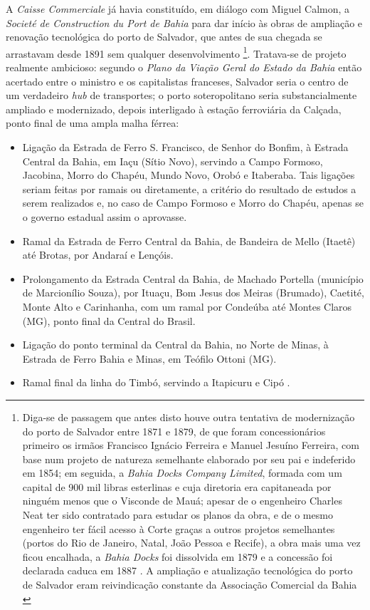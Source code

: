 A \textit{Caisse Commerciale} já havia constituído, em diálogo com Miguel Calmon, a \textit{Societé de Construction du Port de Bahia} para dar início às obras de ampliação e renovação tecnológica do porto de Salvador, que antes de sua chegada se arrastavam desde 1891 sem qualquer desenvolvimento \cite[p.~176-180]{rosado_porto_2016}\footnote{Diga-se de passagem que antes disto houve outra tentativa de modernização do porto de Salvador entre 1871 e 1879, de que foram concessionários primeiro os irmãos Francisco Ignácio Ferreira e Manuel Jesuíno Ferreira, com base num projeto de natureza semelhante elaborado por seu pai e indeferido em 1854; em seguida, a \textit{Bahia Docks Company Limited}, formada com um capital de 900 mil libras esterlinas e cuja diretoria era capitaneada por ninguém menos que o Visconde de Mauá; apesar de o engenheiro Charles Neat ter sido contratado para estudar os planos da obra, e de o mesmo engenheiro ter fácil acesso à Corte graças a outros projetos semelhantes (portos do Rio de Janeiro, Natal, João Pessoa e Recife), a obra mais uma vez ficou encalhada, a \textit{Bahia Docks} foi dissolvida em 1879 e a concessão foi declarada caduca em 1887 \cite[p.~175-176]{rosado_porto_2016}. A ampliação e atualização tecnológica do porto de Salvador eram reivindicação constante da Associação Comercial da Bahia \cite{CUNHA2011,joaci_porto_2016,rosado_porto_2016}}. Tratava-se de projeto realmente ambicioso: segundo o \textit{Plano da Viação Geral do Estado da Bahia} então acertado entre o ministro e os capitalistas franceses, Salvador seria o centro de um verdadeiro \textit{hub} de transportes; o porto soteropolitano seria substancialmente ampliado e modernizado, depois interligado à estação ferroviária da Calçada, ponto final de uma ampla malha férrea:

\begin{itemize}
\item Ligação da Estrada de Ferro S. Francisco, de Senhor do Bonfim, à Estrada Central da Bahia, em Iaçu (Sítio Novo), servindo a Campo Formoso, Jacobina, Morro do Chapéu, Mundo Novo, Orobó e Itaberaba. Tais ligações seriam feitas por ramais ou diretamente, a critério do resultado de estudos a serem realizados e, no caso de Campo Formoso e Morro do Chapéu, apenas se o governo estadual assim o aprovasse.
\item Ramal da Estrada de Ferro Central da Bahia, de Bandeira de Mello (Itaetê) até Brotas, por Andaraí e Lençóis.
\item Prolongamento da Estrada Central da Bahia, de Machado Portella (município de Marcionílio Souza), por Ituaçu, Bom Jesus dos Meiras (Brumado), Caetité, Monte Alto e Carinhanha, com um ramal por Condeúba até Montes Claros (MG), ponto final da Central do Brasil.
\item Ligação do ponto terminal da Central da Bahia, no Norte de Minas, à Estrada de Ferro Bahia e Minas, em Teófilo Ottoni (MG).
\item Ramal final da linha do Timbó, servindo a Itapicuru e Cipó \cite[pp.~215-217]{joaci_porto_2016}.
\end{itemize}

